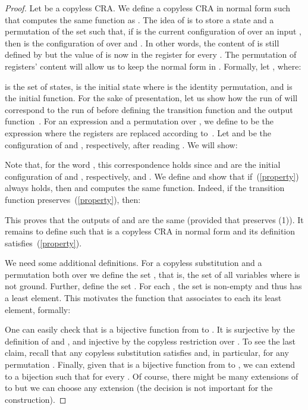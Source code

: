 \begin{proof}
Let  be a copyless CRA. 
 We define a copyless CRA  in normal form such that  computes the same function as .
 The idea of  is to store a state  and a permutation  of the set  such that, if  is the current configuration of  over an input , then  is the configuration of  over  and . 
 In other words, the content of  is still defined by  but the value  of  is now in the register  for every .
 The permutation of registers' content will allow us to keep the normal form in . 
 Formally, let , where:
 
 is the set of states,  is the initial state where  is the identity permutation, and  is the initial function.
 For the sake of presentation, let us show how the run of  will correspond to the run of  before defining the transition function  and the output function~. 
 For an expression  and a permutation  over , we define  to be the expression  where the registers are replaced according to~.
 Let  and  be the configuration of  and , respectively, after reading . We will show:

Note that, for the word , this correspondence holds since  and  are the initial configuration of  and , respectively, and . 
We define  and show that if~(\ref{property}) always holds, then  and  computes the same function. 
Indeed, if the transition function  preserves~(\ref{property}), then:

This proves that the outputs of  and  are the same (provided that  preserves (1)).
It remains to define  such that  is a copyless CRA in normal form and its definition satisfies~(\ref{property}).

\newcommand{\sS}{S_{\sigma, \rho}}
\newcommand{\stau}{\tau_{\sigma, \rho}}

We need some additional definitions. 
For a copyless substitution  and a permutation  both over  we define the set , that is, the set of all variables  where  is not ground.
Further, define the set . For each , the set  is non-empty and thus has a least element. This motivates the function  that associates to each  its least element, formally:

One can easily check that  is a bijective function from  to .
It is surjective by the definition of  and , and injective by the copyless restriction over .
To see the last claim, recall that any copyless substitution satisfies  and, in particular,  for any permutation . 
Finally, given that  is a bijective function from  to , we can extend  to a bijection  such that  for every .
Of course, there might be many extensions of  to  but we can choose any extension (the decision is not important for the construction).


\end{proof}
